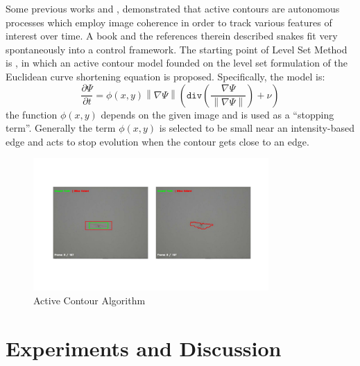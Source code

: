 Some previous works \cite{betser2004automatic} and \cite{sattigeri2007vision}, demonstrated that active contours are autonomous processes which employ image coherence in order to track various features of interest over time. A book \cite{blake1998active}and the references therein described snakes fit very spontaneously into a control framework. The starting point of Level Set Method is  \cite{368173}, \cite{Caselles1993} in which an active contour model founded on the level set formulation of the Euclidean curve shortening equation is proposed. Specifically, the model is:
\begin{equation} \label{eq:BasicModel}
\frac{\partial \Psi}{\partial t} = \phi(x,y) \left\|\nabla\Psi\right\| (\texttt{div}(\frac{\nabla \Psi}{\left\|\nabla\Psi\right\|})+\nu) 
\end{equation}
the function $ \phi(x,y) $ depends on the given image and is used as a ``stopping term''. Generally the term  $ \phi(x,y) $ is selected to be small near an intensity-based edge and acts to stop evolution when the contour gets close to an edge.

\begin{figure}[!th]
	\centering
	\includegraphics[width=0.8\textwidth]{Figs/chp04_07_active_contour_demo.pdf}
	\caption{Active Contour Algorithm}
	\label{fig:chp04_07_active_contour_demo}    
\end{figure}





\section{Experiments and Discussion}
